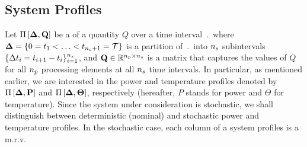 \subsection{System Profiles} 
Let $\prof{\m{Q}}$ be a  of a quantity $Q$ over a time interval $\period$ where $\boldsymbol{\Delta} = \{ 0 = t_1 < \dotsc < t_{{n_s} + 1} = \mathcal{T} \}$ is a partition of $\period$ into ${n_s}$ subintervals $\{ \Delta t_i = t_{i+1} - t_i \}_{i = 1}^{{n_s}}$, and $\m{Q} \in \real^{\cores \times \steps}$ is a matrix that captures the values of $Q$ for all ${n_p}$ processing elements at all ${n_s}$ time intervals. In particular, as mentioned earlier, we are interested in the power and temperature profiles denoted by $\prof{\mP}$ and $\Pi\left[\boldsymbol{\Delta}, {\boldsymbol\Theta}\right]$, respectively (hereafter, $P$ stands for power and $\Theta$ for temperature). Since the system under consideration is stochastic, we shall distinguish between deterministic (nominal) and stochastic power and temperature profiles. In the stochastic case, each column of a system profiles is a m.r.v.
